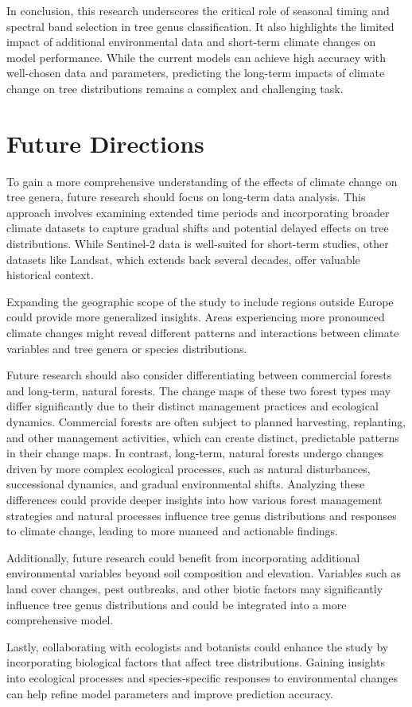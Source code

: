 In conclusion, this research underscores the critical role of seasonal timing and spectral band selection in tree genus classification. It also highlights the limited impact of additional environmental data and short-term climate changes on model performance. While the current models can achieve high accuracy with well-chosen data and parameters, predicting the long-term impacts of climate change on tree distributions remains a complex and challenging task.

\section{Future Directions}

To gain a more comprehensive understanding of the effects of climate change on tree genera, future research should focus on long-term data analysis. This approach involves examining extended time periods and incorporating broader climate datasets to capture gradual shifts and potential delayed effects on tree distributions. While Sentinel-2 data is well-suited for short-term studies, other datasets like Landsat, which extends back several decades, offer valuable historical context.

Expanding the geographic scope of the study to include regions outside Europe could provide more generalized insights. Areas experiencing more pronounced climate changes might reveal different patterns and interactions between climate variables and tree genera or species distributions.

Future research should also consider differentiating between commercial forests and long-term, natural forests. The change maps of these two forest types may differ significantly due to their distinct management practices and ecological dynamics. Commercial forests are often subject to planned harvesting, replanting, and other management activities, which can create distinct, predictable patterns in their change maps. In contrast, long-term, natural forests undergo changes driven by more complex ecological processes, such as natural disturbances, successional dynamics, and gradual environmental shifts. Analyzing these differences could provide deeper insights into how various forest management strategies and natural processes influence tree genus distributions and responses to climate change, leading to more nuanced and actionable findings.

Additionally, future research could benefit from incorporating additional environmental variables beyond soil composition and elevation. Variables such as land cover changes, pest outbreaks, and other biotic factors may significantly influence tree genus distributions and could be integrated into a more comprehensive model.

Lastly, collaborating with ecologists and botanists could enhance the study by incorporating biological factors that affect tree distributions. Gaining insights into ecological processes and species-specific responses to environmental changes can help refine model parameters and improve prediction accuracy.